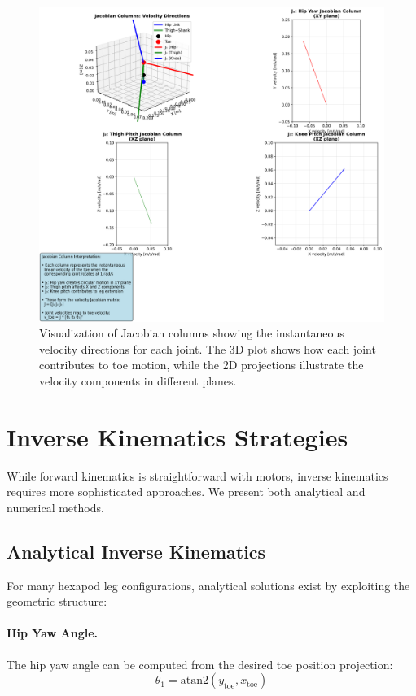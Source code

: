 \documentclass[11pt]{article}
\begin{document}
\begin{figure}[H]
    \centering
    \includegraphics[width=\textwidth]{illustrations/jacobian_visualization-py.png}
    \caption{Visualization of Jacobian columns showing the instantaneous velocity directions for each joint. The 3D plot shows how each joint contributes to toe motion, while the 2D projections illustrate the velocity components in different planes.}
    \label{fig:jacobian_viz}
\end{figure}

\section{Inverse Kinematics Strategies}

While forward kinematics is straightforward with motors, inverse kinematics requires more sophisticated approaches. We present both analytical and numerical methods.

\subsection{Analytical Inverse Kinematics}

For many hexapod leg configurations, analytical solutions exist by exploiting the geometric structure:

\paragraph{Hip Yaw Angle.} The hip yaw angle can be computed from the desired toe position projection:
\[\theta_1 = \text{atan2}(y_{\text{toe}}, x_{\text{toe}})\]
\end{document}
